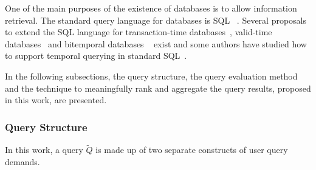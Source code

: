 One of the main purposes of the existence of databases is to allow information retrieval. The standard query language for databases is SQL ~\cite{Mel93}. Several proposals to extend the SQL language for transaction-time databases~\cite{Sarda90}, valid-time databases~\cite{gad92} and bitemporal databases ~\cite{TSQL} exist and some authors have studied how to support temporal querying in standard SQL~\cite{Snodgrass98}.

In the following subsections, the query structure, the query evaluation method and the technique to meaningfully rank and aggregate the query results, proposed in this work, are presented. 






\subsubsection{Query Structure}
In this work, a query $\tilde{Q}$ is made up of two separate constructs of user query demands.


